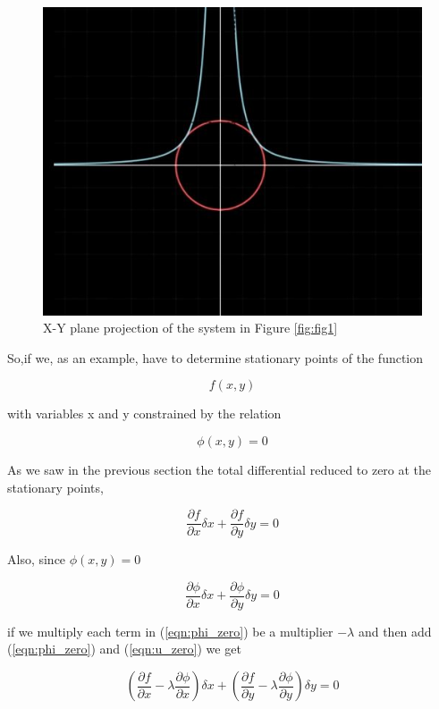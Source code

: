 \documentclass[]{article}
\begin{document}
\begin{figure}[h]
\centering
\includegraphics[width=0.7\linewidth]{img/fig_2}
\caption{X-Y plane projection of the system in Figure \ref{fig:fig1}}
\label{fig:fig2}
\end{figure}

\bigskip

So,if we, as an example, have to determine stationary points of the function

\[
f(x,y)
\]

with variables x and y constrained by the relation

\begin{equation}
\label{eqn:constraint}
\phi(x,y) = 0
\end{equation}

As we saw in the previous section the total differential reduced to zero at the stationary points, 

\begin{equation}
\label{eqn:u_zero}
\frac{\partial f}{\partial x} \delta x  +\frac{\partial f}{\partial y} \delta y  = 0
\end{equation}

Also, since $\phi(x,y) = 0$

\begin{equation}
 \label{eqn:phi_zero}
  \frac{\partial \phi}{\partial x} \delta x  +\frac{\partial \phi}{\partial y} \delta y  = 0
\end{equation}

if we multiply each term in (\ref{eqn:phi_zero}) be a multiplier $-\lambda$ and then add (\ref{eqn:phi_zero}) and (\ref{eqn:u_zero}) we get

\[
\left( \frac{\partial f}{\partial x} - \lambda \frac{\partial \phi}{\partial x} \right) \delta x  + 
\left( \frac{\partial f}{\partial y} - \lambda \frac{\partial \phi}{\partial y} \right) \delta y
 = 0
\]
\end{document}

